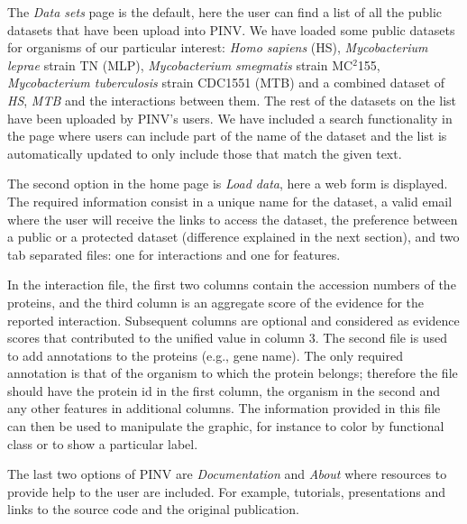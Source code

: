 The \emph{Data sets} page is the default, here the user can find a list of all the public datasets that have been upload into PINV. We have loaded some public datasets for organisms of our particular interest: \emph{Homo sapiens} (HS), \emph{Mycobacterium leprae} strain TN (MLP), \emph{Mycobacterium smegmatis} strain MC$^2$155, \emph{Mycobacterium tuberculosis} strain CDC1551  (MTB) and a combined dataset of \emph{HS}, \emph{MTB} and the interactions between them. The rest of the datasets on the list have been uploaded by PINV's users. We have included a search functionality in the page where users can include part of the name of the dataset and the list is automatically updated to only include those that match the given text.

The second option in the home page is \emph{Load data}, here a web form is displayed. The required information consist in a unique name for the dataset, a valid email where the user will receive the links to access the dataset, the preference between a public or a protected dataset (difference explained in the next section), and two tab separated files: one for interactions and one for features.

In the interaction file, the first two columns contain the accession numbers of the proteins, and the third column is an aggregate score of the evidence for the reported interaction. Subsequent columns are optional and considered as evidence scores that contributed to the unified value in column 3.
The second file is used to add annotations to the proteins (e.g., gene name). The only required annotation is that of the organism to which the protein belongs; therefore the file should have the protein id in the first column, the organism in the second and any other features in additional columns. The information provided in this file can then be used to manipulate the graphic, for instance to color by functional class or to show a particular label.

The last two options of PINV are \emph{Documentation} and \emph{About} where resources to provide help to the user are included. For example, tutorials, presentations and links to the source code and the original publication.

